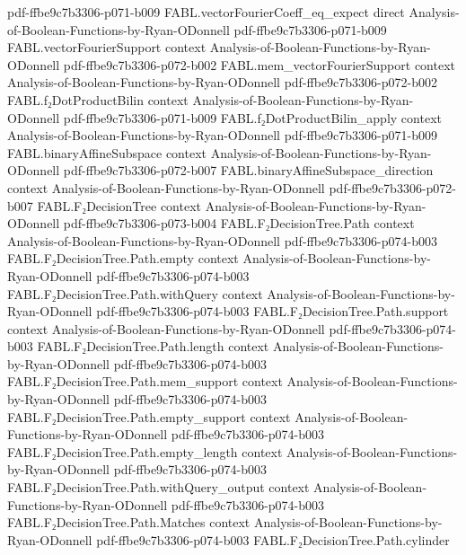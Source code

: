 \begin{theorem}
  {pdf-ffbe9c7b3306-p071-b009}
\proofstep
  {FABL.vectorFourierCoeff_eq_expect}
  {direct}
  {Analysis-of-Boolean-Functions-by-Ryan-ODonnell}
  {pdf-ffbe9c7b3306-p071-b009}
\proofstep
  {FABL.vectorFourierSupport}
  {context}
  {Analysis-of-Boolean-Functions-by-Ryan-ODonnell}
  {pdf-ffbe9c7b3306-p072-b002}
\proofstep
  {FABL.mem_vectorFourierSupport}
  {context}
  {Analysis-of-Boolean-Functions-by-Ryan-ODonnell}
  {pdf-ffbe9c7b3306-p072-b002}
\proofstep
  {FABL.f₂DotProductBilin}
  {context}
  {Analysis-of-Boolean-Functions-by-Ryan-ODonnell}
  {pdf-ffbe9c7b3306-p071-b009}
\proofstep
  {FABL.f₂DotProductBilin_apply}
  {context}
  {Analysis-of-Boolean-Functions-by-Ryan-ODonnell}
  {pdf-ffbe9c7b3306-p071-b009}
\proofstep
  {FABL.binaryAffineSubspace}
  {context}
  {Analysis-of-Boolean-Functions-by-Ryan-ODonnell}
  {pdf-ffbe9c7b3306-p072-b007}
\proofstep
  {FABL.binaryAffineSubspace_direction}
  {context}
  {Analysis-of-Boolean-Functions-by-Ryan-ODonnell}
  {pdf-ffbe9c7b3306-p072-b007}
\proofstep
  {FABL.F₂DecisionTree}
  {context}
  {Analysis-of-Boolean-Functions-by-Ryan-ODonnell}
  {pdf-ffbe9c7b3306-p073-b004}
\proofstep
  {FABL.F₂DecisionTree.Path}
  {context}
  {Analysis-of-Boolean-Functions-by-Ryan-ODonnell}
  {pdf-ffbe9c7b3306-p074-b003}
\proofstep
  {FABL.F₂DecisionTree.Path.empty}
  {context}
  {Analysis-of-Boolean-Functions-by-Ryan-ODonnell}
  {pdf-ffbe9c7b3306-p074-b003}
\proofstep
  {FABL.F₂DecisionTree.Path.withQuery}
  {context}
  {Analysis-of-Boolean-Functions-by-Ryan-ODonnell}
  {pdf-ffbe9c7b3306-p074-b003}
\proofstep
  {FABL.F₂DecisionTree.Path.support}
  {context}
  {Analysis-of-Boolean-Functions-by-Ryan-ODonnell}
  {pdf-ffbe9c7b3306-p074-b003}
\proofstep
  {FABL.F₂DecisionTree.Path.length}
  {context}
  {Analysis-of-Boolean-Functions-by-Ryan-ODonnell}
  {pdf-ffbe9c7b3306-p074-b003}
\proofstep
  {FABL.F₂DecisionTree.Path.mem_support}
  {context}
  {Analysis-of-Boolean-Functions-by-Ryan-ODonnell}
  {pdf-ffbe9c7b3306-p074-b003}
\proofstep
  {FABL.F₂DecisionTree.Path.empty_support}
  {context}
  {Analysis-of-Boolean-Functions-by-Ryan-ODonnell}
  {pdf-ffbe9c7b3306-p074-b003}
\proofstep
  {FABL.F₂DecisionTree.Path.empty_length}
  {context}
  {Analysis-of-Boolean-Functions-by-Ryan-ODonnell}
  {pdf-ffbe9c7b3306-p074-b003}
\proofstep
  {FABL.F₂DecisionTree.Path.withQuery_output}
  {context}
  {Analysis-of-Boolean-Functions-by-Ryan-ODonnell}
  {pdf-ffbe9c7b3306-p074-b003}
\proofstep
  {FABL.F₂DecisionTree.Path.Matches}
  {context}
  {Analysis-of-Boolean-Functions-by-Ryan-ODonnell}
  {pdf-ffbe9c7b3306-p074-b003}
\proofstep
  {FABL.F₂DecisionTree.Path.cylinder}

\end{theorem}
